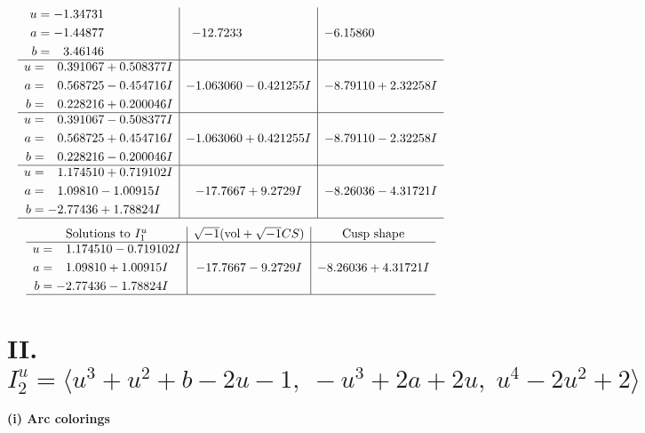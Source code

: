 \documentclass[1p]{elsarticle_modified}
\theoremstyle{definition}
\newcommand{\I}{\sqrt{-1}}
\begin{document}
$$\begin{array}{c|c|c}
\begin{aligned}
u &= -1.34731\phantom{ +0.000000I} \\
a &= -1.44877\phantom{ +0.000000I} \\
b &= \phantom{-}3.46146\phantom{ +0.000000I}\end{aligned}
 & -12.7233\phantom{ +0.000000I} & -6.15860\phantom{ +0.000000I} \\ \hline\begin{aligned}
u &= \phantom{-}0.391067 + 0.508377 I \\
a &= \phantom{-}0.568725 - 0.454716 I \\
b &= \phantom{-}0.228216 + 0.200046 I\end{aligned}
 & -1.063060 - 0.421255 I & -8.79110 + 2.32258 I \\ \hline\begin{aligned}
u &= \phantom{-}0.391067 - 0.508377 I \\
a &= \phantom{-}0.568725 + 0.454716 I \\
b &= \phantom{-}0.228216 - 0.200046 I\end{aligned}
 & -1.063060 + 0.421255 I & -8.79110 - 2.32258 I \\ \hline\begin{aligned}
u &= \phantom{-}1.174510 + 0.719102 I \\
a &= \phantom{-}1.09810 - 1.00915 I \\
b &= -2.77436 + 1.78824 I\end{aligned}
 & -17.7667 + 9.2729 I & -8.26036 - 4.31721 I\\
 \hline 
 \end{array}$$\newpage$$\begin{array}{c|c|c}  
\text{Solutions to }I^u_{1}& \I (\text{vol} + \sqrt{-1}CS) & \text{Cusp shape}\\
 \hline 
\begin{aligned}
u &= \phantom{-}1.174510 - 0.719102 I \\
a &= \phantom{-}1.09810 + 1.00915 I \\
b &= -2.77436 - 1.78824 I\end{aligned}
 & -17.7667 - 9.2729 I & -8.26036 + 4.31721 I\\
 \hline 
 \end{array}$$\newpage\newpage\renewcommand{\arraystretch}{1}
\centering \section*{II. $I^u_{2}= \langle u^3+u^2+b-2 u-1,\;- u^3+2 a+2 u,\;u^4-2 u^2+2 \rangle$}
\flushleft \textbf{(i) Arc colorings}\\
\end{document}

